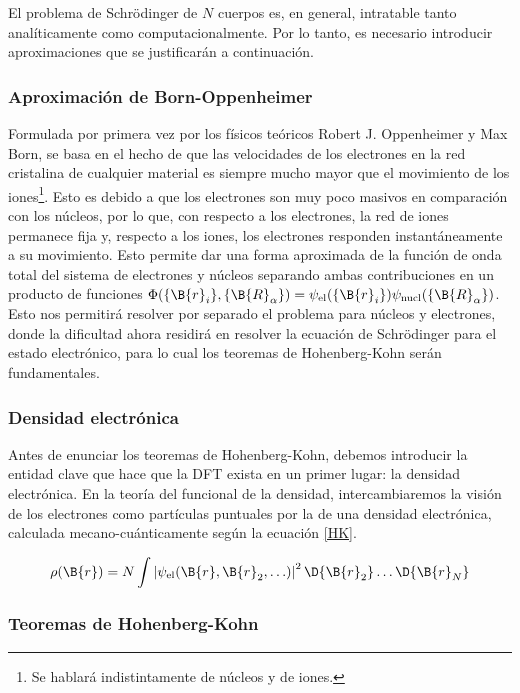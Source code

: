 El problema de Schrödinger de $N$ cuerpos es, en general, intratable tanto analíticamente como computacionalmente. Por lo tanto, es necesario introducir aproximaciones que se justificarán a continuación. 

\subsubsection{Aproximación de Born-Oppenheimer}
Formulada por primera vez por los físicos teóricos Robert J. Oppenheimer y Max Born, se basa en el hecho de que las velocidades de los electrones en la red cristalina de cualquier material es siempre mucho mayor que el movimiento de los iones\footnote{Se hablará indistintamente de núcleos y de iones.}. Esto es debido a que los electrones son muy poco masivos en comparación con los núcleos, por lo que, con respecto a los electrones, la red de iones permanece fija y, respecto a los iones, los electrones responden instantáneamente a su movimiento. Esto permite dar una forma aproximada de la función de onda total del sistema de electrones y núcleos separando ambas contribuciones en un producto de funciones $\Phi(\{ \B{r}_i \} , \{ \B{R}_\alpha \}) = \psi_\text{el}(\{\B{r}_i\}) \psi_\text{nucl}(\{ \B{R}_\alpha \})$. Esto nos permitirá resolver por separado el problema para núcleos y electrones, donde la dificultad ahora residirá en resolver la ecuación de Schrödinger para el estado electrónico, para lo cual los teoremas de Hohenberg-Kohn serán fundamentales.

\subsubsection{Densidad electrónica}
Antes de enunciar los teoremas de Hohenberg-Kohn, debemos introducir la entidad clave que hace que la DFT exista en un primer lugar: la densidad electrónica. En la teoría del funcional de la densidad, intercambiaremos la visión de los electrones como partículas puntuales por la de una densidad electrónica, calculada mecano-cuánticamente según la ecuación \ref{HK}.

\begin{equation} \label{HK}
    \rho(\B{r}) = N \int \left | \psi_\text{el} (\B{r},\B{r}_2,\ldots) \right |^2 \D{\B{r}_2}\ldots \D{\B{r}_N}
\end{equation}

\subsubsection{Teoremas de Hohenberg-Kohn}

